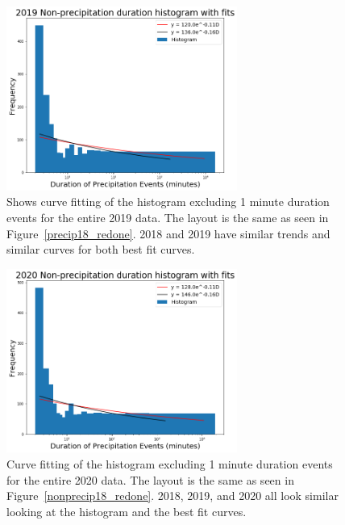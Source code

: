 \documentclass[11pt]{report}
\begin{document}
\clearpage

\begin{figure}[t]
  \centering
  \includegraphics[width=0.675\textwidth]{Figures/nonprecip_2019_new.png}
  \caption[2019 Non-precipitation duration Exponentials with contrasting curve fitting]
  {\label{nonprecip19_redone} Shows curve fitting of the histogram excluding
    1 minute duration events for the entire 2019 data. The layout is the
    same as seen in Figure~\ref{precip18_redone}. 2018 and 2019 have similar trends
    and similar curves for both best fit curves.}
\end{figure}

\begin{figure}[b]
  \centering
  \includegraphics[width=0.675\textwidth]{Figures/nonprecip_2020_new.png}
  \caption[2020 Non-precipitation duration Exponentials with contrasting
    curve fitting] {\label{nonprecip20_redone}Curve fitting of the histogram
    excluding 1 minute duration events for the entire 2020 data. The layout
    is the same as seen in Figure~\ref{nonprecip18_redone}. 2018, 2019, and
    2020 all look similar looking at the histogram and the best fit curves.}
\end{figure}
\end{document}
